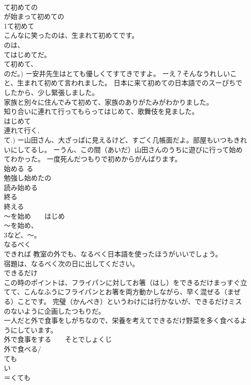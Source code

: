 \documentclass[8pt]{extreport}
\begin{document}
\begin{CJK}{UTF8}{min}
\\	て初めての
\\	が始まって初めての
\\	1て初めて
\\	こんなに笑ったのは、生まれて初めてです。 
\\	のは、
\\	てはじめてだ。 
\\	て初めて、
\\	のだ。) ー安井先生はとても優しくてすてきですよ。 ーえ？そんなうれしいこと、生まれて初めて言われました。 日本に来て初めての日本語でのスーぴちでしたから、少し緊張しました。 
\\	家族と別々に住んでみて初めて、家族のありがたみがわかりました。 
\\	知り合いに連れて行ってもらってはじめて、歌舞伎を見ました。 
\\	はじめて 
\\	連れて行く, 
\\	て.) ー山田さん、大ざっぱに見えるけど、すごく几帳面だよ。部屋もいつもきれいにしてるし。 ーうん、この間（あいだ）山田さんのうちに遊びに行って始めてわかった。 一度死んだつもりで初めからがんばります。 
\\	始める る
\\	勉強し始めたの 
\\	読み始める　
\\	終る　
\\	終える 
\\	～を始め　　はじめ 
\\	～を始め、
\\	3など、～。
\\	なるべく	
\\	できれば 教室の外でも、なるべく日本語を使ったほうがいいでしょう。 
\\	宿題は、なるべく次の日に出してください。 
\\	できるだけ 
\\	この時のポイントは、フライパンに対してお箸（はし）をできるだけまっすぐ立てて、こんなふうにフライパンとお箸を両方動かしながら、早く混ぜる（まぜる）ことです。 完璧（かんぺき）というわけには行かないが、できるだけミスのないように企画したつもりだ。 
\\	一人だと外で食事をしがちなので、栄養を考えてできるだけ野菜を多く食べるようにしています。 
\\	外で食事をする　　そとでしょくじ 
\\	外で食べる/
\\	ても	
\\	い
\\	＝くても 

\end{CJK}
\end{document}
